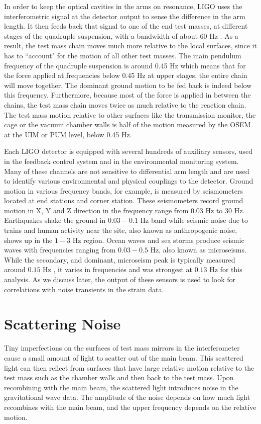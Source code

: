 \documentclass[12pt]{iopart}
\begin{document}
In order to keep the optical cavities in the arms on resonance, LIGO uses the interferometric signal at the detector output to sense the difference in the arm length. It then feeds back that signal to one of the end test masses, at different stages of the quadruple suspension, with a bandwidth of about 60 Hz \cite{Martynov_2016}. As a result, the test mass chain moves much more relative to the local surfaces, since it has to ``account" for the motion of all other test masses. The main pendulum frequency of the quadruple suspension is around 0.45 Hz which means that for the force applied at frequencies below 0.45 Hz at upper stages, the entire chain will move together. The dominant ground motion to be fed back is indeed below this frequency. Furthermore, because most of the force is applied in between the chains, the test mass chain moves twice as much relative to the reaction chain. The test mass motion relative to other surfaces like the transmission monitor, the cage or the vacuum chamber walls is half of the motion measured by the OSEM at the UIM or PUM level, below 0.45 Hz.

Each LIGO detector is equipped with several hundreds of auxiliary sensors, used in the feedback control system and in the environmental monitoring system. Many of these channels are not sensitive to differential arm length and are used to identify various environmental and physical couplings to the detector.
Ground motion in various frequency bands, for example, is measured by seismometers located at end stations and corner station. These seismometers record ground motion in X, Y and Z direction in the frequency range from 0.03 Hz to 30 Hz. Earthquakes shake the ground in $0.03-0.1$ Hz band while seismic noise due to trains and human activity near the site, also known as anthropogenic noise, shows up in the $1-3$ Hz region. Ocean waves and sea storms produce seismic waves with frequencies ranging from $0.03-0.5$ Hz, also known as microseisms. While the secondary, and dominant, microseism peak is typically measured around $0.15$ Hz \cite{Cessaro1994SourcesOP,Effler_2015}, it varies in frequencies and was strongest at $0.13$ Hz for this analysis. As we discuss later, the output of these sensors is used to look for correlations with noise transients in the strain data.



 
\section{Scattering Noise}\label{scatteringnoise}
Tiny imperfections on the surfaces of test mass mirrors in the interferometer cause a small amount of light to scatter out of the main beam. This scattered light can then reflect from surfaces that have large relative motion relative to the test mass such as the chamber walls and then back to the test mass. Upon recombining with the main beam, the scattered light introduces noise in the gravitational wave data. The amplitude of the noise depends on how much light recombines with the main beam, and the upper frequency depends on the relative motion.
\end{document}

